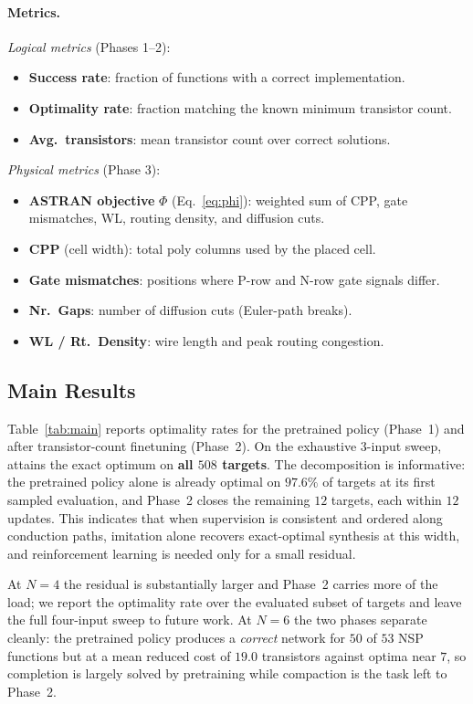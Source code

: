 \paragraph{Metrics.}
\textit{Logical metrics} (Phases 1--2):
\begin{itemize}[leftmargin=*, topsep=2pt, itemsep=0pt]
  \item \textbf{Success rate}: fraction of functions with a correct implementation.
  \item \textbf{Optimality rate}: fraction matching the known minimum transistor count.
  \item \textbf{Avg.\ transistors}: mean transistor count over correct solutions.
\end{itemize}
\textit{Physical metrics} (Phase 3):
\begin{itemize}[leftmargin=*, topsep=2pt, itemsep=0pt]
  \item \textbf{ASTRAN objective} $\Phi$ (Eq.~\ref{eq:phi}): weighted sum of
        CPP, gate mismatches, WL, routing density, and diffusion cuts.
  \item \textbf{CPP} (cell width): total poly columns used by the placed cell.
  \item \textbf{Gate mismatches}: positions where P-row and N-row gate signals differ.
  \item \textbf{Nr.\ Gaps}: number of diffusion cuts (Euler-path breaks).
  \item \textbf{WL / Rt.\ Density}: wire length and peak routing congestion.
\end{itemize}

\subsection{Main Results}

Table~\ref{tab:main} reports optimality rates for the pretrained policy
(Phase~1) and after transistor-count finetuning (Phase~2).
On the exhaustive $3$-input sweep, \method{} attains the exact optimum on
\textbf{all $508$ targets}.
The decomposition is informative: the pretrained policy alone is already
optimal on $97.6\%$ of targets at its first sampled evaluation, and Phase~2
closes the remaining $12$ targets, each within $12$ updates.
This indicates that when supervision is consistent and ordered along
conduction paths, imitation alone recovers exact-optimal synthesis at this
width, and reinforcement learning is needed only for a small residual.

At $N=4$ the residual is substantially larger and Phase~2 carries more of the
load; we report the optimality rate over the evaluated subset of targets and
leave the full four-input sweep to future work.
At $N=6$ the two phases separate cleanly: the pretrained policy produces a
\emph{correct} network for $50$ of $53$ NSP functions but at a mean reduced
cost of $19.0$ transistors against optima near $7$, so completion is largely
solved by pretraining while compaction is the task left to Phase~2.

